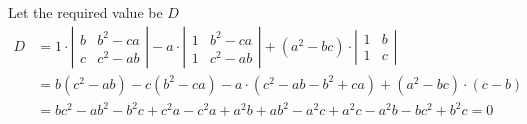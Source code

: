 \begin{solution}[\halfpage]
    \begin{fullwidth}
    Let the required value be $D$
	\begin{align}
	  D &= 1\cdot\left|
	    \begin{array}{cc}
	      b & b^2-ca \\
	      c & c^2-ab
	    \end{array}
	  \right| - a\cdot \left|
	    \begin{array}{cc}
	      1 & b^2-ca \\
	      1 & c^2-ab
	    \end{array}
	  \right| + (a^2-bc)\cdot\left|
	    \begin{array}{cc}
	      1 & b \\
	      1 & c
	    \end{array}
	  \right| \\
	  &= b(c^2-ab) - c(b^2-ca) -a\cdot(c^2-ab-b^2+ca) + (a^2-bc)\cdot(c-b) \\
	  &= bc^2-ab^2-b^2c+c^2a-c^2a+a^2b+ab^2-a^2c+a^2c-a^2b-bc^2+b^2c = 0
	\end{align}
	\end{fullwidth}
\end{solution}
